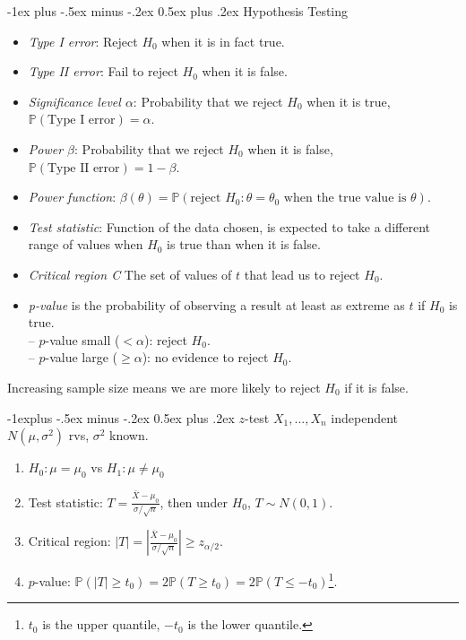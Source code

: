 \documentclass[10pt,landscape]{article}
\makeatletter
\newcommand{\Prob}{\mathbb{P}}
\renewcommand{\section}{\@startsection{section}{1}{0mm}%
                                {-1ex plus -.5ex minus -.2ex}%
                                {0.5ex plus .2ex}%
                                {\normalfont\large\bfseries}}
\renewcommand{\subsection}{\@startsection{subsection}{2}{0mm}%
                                {-1explus -.5ex minus -.2ex}%
                                {0.5ex plus .2ex}%
                                {\normalfont\normalsize\bfseries}}
\makeatother
\begin{document}
\begin{multicols}{3}
\section{Hypothesis Testing}
\begin{itemize}
	\item \emph{Type I error}: Reject $H_0$ when it is in fact true.
	\item \emph{Type II error}: Fail to reject $H_0$ when it is false.
	\item \emph{Significance level $\alpha$}: Probability that we reject $H_0$ when it is true, $\Prob(\text{Type I error}) = \alpha$.
	\item \emph{Power $\beta$}: Probability that we reject $H_0$ when it is false, $\Prob(\text{Type II error}) = 1-\beta$.
	\item \emph{Power function}: $\beta(\theta) = \Prob(\text{reject } H_0 : \theta = \theta_0 \text{ when the true value is } \theta)$.
	\item \emph{Test statistic}: Function of the data chosen, is expected to take a different range of values when $H_0$ is true than when it is false.
	\item \emph{Critical region C} The set of values of $t$ that lead us to reject $H_0$.    
	\item \emph{p-value} is the probability of observing a result at least as extreme as $t$ if $H_0$ is true. \\
		-- $p$-value small ($< \alpha$): reject $H_0$. \\
		-- $p$-value large ($\geq \alpha$):  no evidence to reject $H_0$. 
\end{itemize}
Increasing sample size means we are more likely to reject $H_0$ if it is false.

	\subsection{$z$-test}
	$X_1,...,X_n$ independent $N(\mu, \sigma^2)$ rvs, $\sigma^2$ known.
	\begin{enumerate}
		\item $ H_0 : \mu = \mu_0$ \quad vs \quad $ H_1 : \mu \neq \mu_0$
		\item Test statistic: $\displaystyle T = \frac{\bar{X} - \mu_0}{\sigma/\sqrt{n}}$, then under $H_0$, $T \sim N(0,1)$.
		\item Critical region: $\displaystyle |T| =\left| \frac{\bar{X} - \mu_0}{\sigma/\sqrt{n}} \right| \geq z_{\alpha/2}$.
		\item $p$-value: $\Prob(|T| \geq t_0) = 2 \Prob(T \geq t_0) = 2\Prob(T \leq -t_0)$\footnote{$t_0$ is the upper quantile, $-t_0$ is the lower quantile.}.
	\end{enumerate}


\end{multicols}
\end{document}
